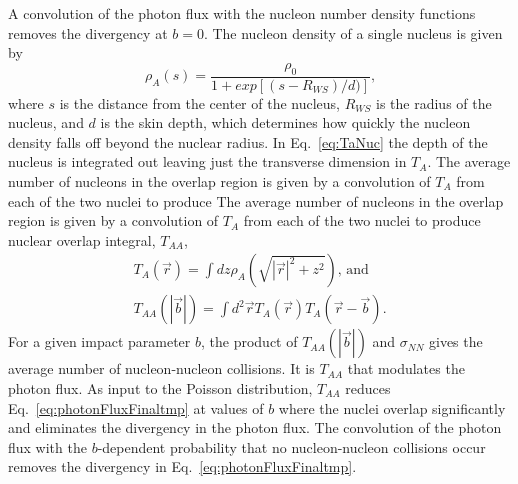     A convolution of the photon flux with the nucleon number density functions 
      removes the divergency at $b=0$. 
    The nucleon density of a single nucleus is given by
    \begin{equation} 
      \rho_{A}(s)=\frac{\rho_{0}}{1+exp[(s-R_{WS})/d)]}\textrm{,}
      \label{eq:woodsSaxon}
    \end{equation}
    where $s$ is the distance from the center of the 
      nucleus, $R_{WS}$ is the radius of the nucleus, and $d$ is the skin depth, 
      which determines how quickly the nucleon density falls off beyond the 
      nuclear radius. 
    In Eq.~\ref{eq:TaNuc} the depth of the nucleus is integrated out leaving
      just the transverse dimension in $T_{A}$.
    The average number of nucleons in the overlap region is given by a
      convolution of $T_A$ from each of the two nuclei to produce 
    The average number of nucleons in the overlap region is given by a 
      convolution of $T_A$ from each of the two nuclei to produce nuclear overlap 
      integral, $T_{AA}$,
    \begin{eqnarray} \label{eq:TaNuc}
      T_{A}(\vec{r})=\int{dz\rho_{A}(\sqrt{|\vec{r}|^{2}+z^{2}})}\textrm{, and} \nonumber \\ 
      T_{AA}(|\vec{b}|)=\int{d^{2}\vec{r}T_{A}(\vec{r})T_{A}(\vec{r}-\vec{b})}\textrm{.}
    \end{eqnarray}
    For a given impact parameter $b$, the product of $T_{AA}(|\vec{b}|)$ and
      $\sigma_{NN}$ gives the average number of nucleon-nucleon collisions. 
    It is $T_{AA}$ that modulates the photon flux. 
    As input to the Poisson distribution, $T_{AA}$ reduces 
      Eq.~\ref{eq:photonFluxFinaltmp} at values of $b$ where the nuclei overlap 
      significantly and eliminates the divergency in the photon flux. 
    The convolution of the photon flux with the $b$-dependent probability that 
      no nucleon-nucleon collisions occur removes the divergency in 
      Eq.~\ref{eq:photonFluxFinaltmp}. 
     
